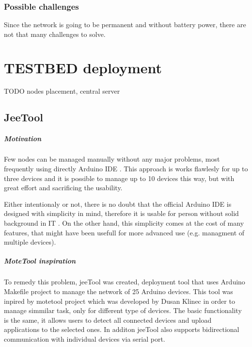 \documentclass[
  digital, %
  table,   %
  nolof,     %
  nolot,     %
           oneside
]{fithesis3}
\begin{document}
  \subsection{Possible challenges}
  Since the network is going to be permanent and without battery power, there are not that many challenges to solve. 


\chapter{TESTBED deployment}
TODO nodes placement, central server

  \section{JeeTool} %
\paragraph{Motivation}
  Few nodes can be managed manually without any major problems, most frequently using directly Arduino IDE \cite{Arduino}.
  This approach is works flawlesly for up to three devices and it is possible to manage up to 10 devices this way, but with great effort and sacrificing the usability.

  Either intentionaly or not, there is no doubt that the official Arduino IDE is designed with simplicity in mind, therefore it is usable for person without solid background in IT \cite{ArduinoIntro}.
  On the other hand, this simplicity comes at the cost of many features, that might have been usefull for more advanced use (e.g. managment of multiple devices).

\paragraph{MoteTool inspiration}
  To remedy this problem, jeeTool \cite{JeeTool}
  was created, deployment tool that uses Arduino Makefile project \cite{ArduinoMK}
  to manage the network of 25 Arduino devices. This tool was inpired by motetool project \cite{motetool}
  which was developed by Dusan Klinec in order to manage simmilar task, only for different type of devices. The basic functionality is the same, it allows users to detect all connected devices and upload applications to the selected ones. In additon jeeTool also supports bidirectional communication with individual devices via serial port.
\end{document}
